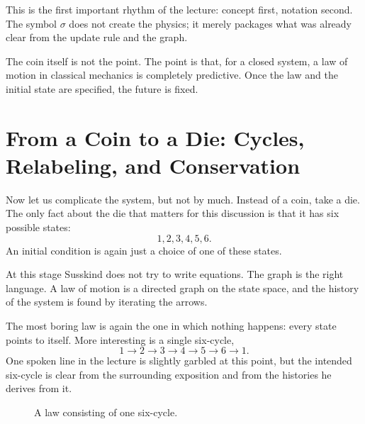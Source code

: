 This is the first important rhythm of the lecture: concept first, notation second. The symbol \(\sigma\) does not create the physics; it merely packages what was already clear from the update rule and the graph.

The coin itself is not the point. The point is that, for a closed system, a law of motion in classical mechanics is completely predictive. Once the law and the initial state are specified, the future is fixed.

\section{From a Coin to a Die: Cycles, Relabeling, and Conservation}

Now let us complicate the system, but not by much. Instead of a coin, take a die. The only fact about the die that matters for this discussion is that it has six possible states:
\[
1,2,3,4,5,6.
\]
An initial condition is again just a choice of one of these states.

At this stage Susskind does not try to write equations. The graph is the right language. A law of motion is a directed graph on the state space, and the history of the system is found by iterating the arrows.

The most boring law is again the one in which nothing happens: every state points to itself. More interesting is a single six-cycle,
\begin{equation}
1\to 2\to 3\to 4\to 5\to 6\to 1.
\end{equation}
One spoken line in the lecture is slightly garbled at this point, but the intended six-cycle is clear from the surrounding exposition and from the histories he derives from it.

\begin{figure}
\centering
{}
\caption{A law consisting of one six-cycle.}
\end{figure}

